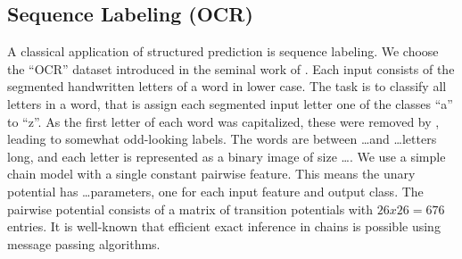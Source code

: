 \subsection{Sequence Labeling (OCR)}
A classical application of structured prediction is sequence labeling.
We choose the ``OCR'' dataset introduced in the seminal work of \citet{taskar2003max}.
Each input consists of the segmented handwritten letters of a word in lower case. The task is to classify
all letters in a word, that is assign each segmented input letter one of the
classes ``a'' to ``z''. As the first letter of each word was capitalized, these
were removed by \citet{taskar2003max}, leading to somewhat odd-looking
labels. The words are between \ldots and \ldots letters long, and each letter
is represented as a binary image of size \ldots.
We use a simple chain model with a single constant pairwise feature.
This means the unary potential has \ldots parameters, one for each input
feature and output class. The pairwise potential consists of a matrix of
transition potentials with $26 x 26=676$ entries.
It is well-known that efficient exact inference in chains is possible using
message passing algorithms. 


